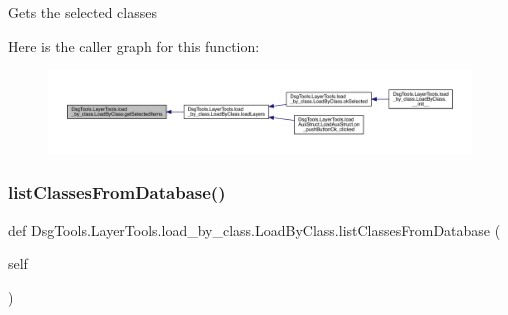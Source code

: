 \begin{DoxyVerb}Gets the selected classes
\end{DoxyVerb}
 Here is the caller graph for this function\+:
\nopagebreak
\begin{figure}[H]
\begin{center}
\leavevmode
\includegraphics[width=350pt]{class_dsg_tools_1_1_layer_tools_1_1load__by__class_1_1_load_by_class_ad0fcaa51e682f1cf9fbbef4f1e2ac8e3_icgraph}
\end{center}
\end{figure}
\mbox{\label{class_dsg_tools_1_1_layer_tools_1_1load__by__class_1_1_load_by_class_a1efa7341ff7e4a8cc6aa15d8e1ef9d9f}} 
\subsubsection{\texorpdfstring{list\+Classes\+From\+Database()}{listClassesFromDatabase()}}
{\footnotesize\ttfamily def Dsg\+Tools.\+Layer\+Tools.\+load\+\_\+by\+\_\+class.\+Load\+By\+Class.\+list\+Classes\+From\+Database (\begin{DoxyParamCaption}\item[{}]{self }\end{DoxyParamCaption})}

